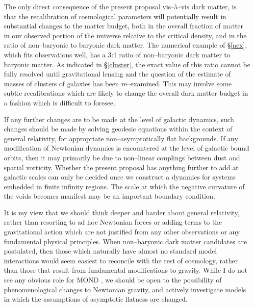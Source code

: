 \documentclass[12pt]{iopart}
\begin{document}
The only direct consequence of the present proposal vis--\`a--vis dark
matter, is that the recalibration of cosmological parameters will
potentially result in substantial changes to the matter budget, both
in the overall fraction of matter in our observed portion of the universe
relative to the critical density, and in
the ratio of non--baryonic to baryonic dark matter. The numerical example
of \S\ref{nex}, which fits observations well, has a 3:1 ratio of
non--baryonic dark matter to baryonic matter. As indicated in \S\ref{cluster},
the exact value of this ratio cannot be fully resolved until
gravitational lensing and the question of the estimate of masses of
clusters of galaxies has been re--examined. This may involve
some subtle recalibrations which are likely to change the overall
dark matter budget in a fashion which is difficult to foresee.

If any further changes are to be made at the level of galactic dynamics,
such changes should be made by solving geodesic equations within the context
of general relativity, for appropriate non--asymptotically flat backgrounds.
If any modification of Newtonian dynamics is encountered at the level of
galactic bound orbits, then it may primarily be due to non--linear
couplings between dust and spatial vorticity. Whether the present
proposal has anything further to add at galactic scales can only be decided
once we construct a dynamics for systems embedded in finite infinity regions.
The scale at which the negative curvature of the voids becomes manifest
may be an important boundary condition.

It is my view that we should think deeper and harder about general
relativity, rather than resorting to ad hoc Newtonian
forces or adding terms to the gravitational action which are not justified
from any other observations or any fundamental physical principles.
When non--baryonic dark matter candidates are postulated, then those which
naturally have almost no standard model interactions \cite{AKG} would seem
easiest to reconcile with the rest of cosmology, rather than those that
result from fundamental modifications to gravity. While
I do not see any obvious role for MOND \cite{mond}, we should be open to the
possibility of phenomenological changes to Newtonian gravity, and
actively investigate models in which the assumptions of asymptotic flatness
are changed.
\end{document}
